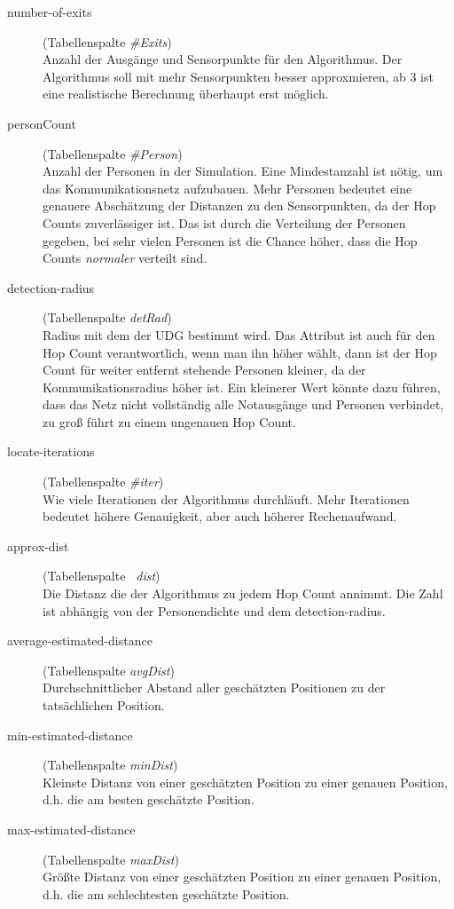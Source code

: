 \begin{description}
   \item[number-of-exits] (Tabellenspalte \emph{\#Exits}) \hfill \\
	Anzahl der Ausgänge und Sensorpunkte für den Algorithmus. Der Algorithmus soll mit mehr Sensorpunkten besser approxmieren, ab 3 ist eine realistische Berechnung überhaupt erst möglich.
   \item[personCount] (Tabellenspalte \emph{\#Person}) \hfill \\
	Anzahl der Personen in der Simulation. Eine Mindestanzahl ist nötig, um das Kommunikationsnetz aufzubauen. Mehr Personen bedeutet eine genauere Abschätzung der Distanzen zu den Sensorpunkten, da der Hop Counts zuverlässiger ist. Das ist durch die Verteilung der Personen gegeben, bei sehr vielen Personen ist die Chance höher, dass die Hop Counts \emph{normaler} verteilt sind.
   \item[detection-radius] (Tabellenspalte \emph{detRad}) \hfill \\
	Radius mit dem der UDG bestimmt wird. Das Attribut ist auch für den Hop Count verantwortlich, wenn man ihn höher wählt, dann ist der Hop Count für weiter entfernt stehende Personen kleiner, da der Kommunikationsradius höher ist. Ein kleinerer Wert könnte dazu führen, dass das Netz nicht vollständig alle Notausgänge und Personen verbindet, zu groß führt zu einem ungenauen Hop Count.
   \item[locate-iterations] (Tabellenspalte \emph{\#iter}) \hfill \\
	Wie viele Iterationen der Algorithmus durchläuft. Mehr Iterationen bedeutet höhere Genauigkeit, aber auch höherer Rechenaufwand.
   \item[approx-dist] (Tabellenspalte \emph{~dist}) \hfill \\
	Die Distanz die der Algorithmus zu jedem Hop Count annimmt. Die Zahl ist abhängig von der Personendichte und dem detection-radius.
   \item[average-estimated-distance] (Tabellenspalte \emph{avgDist}) \hfill \\
	Durchschnittlicher Abstand aller geschätzten Positionen zu der tatsächlichen Position. 
   \item[min-estimated-distance] (Tabellenspalte \emph{minDist}) \hfill \\
	Kleinste Distanz von einer geschätzten Position zu einer genauen Position, d.h. die am besten geschätzte Position.
   \item[max-estimated-distance] (Tabellenspalte \emph{maxDist}) \hfill \\
	Größte Distanz von einer geschätzten Position zu einer genauen Position, d.h. die am schlechtesten geschätzte Position.
\end{description}

